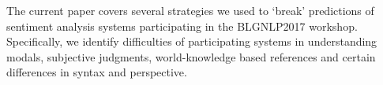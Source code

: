 The current paper covers several strategies we used to `break' predictions of sentiment analysis systems participating in the BLGNLP2017 workshop. Specifically, we identify difficulties of participating systems in understanding modals, subjective judgments, world-knowledge based references and certain differences in syntax and perspective.
